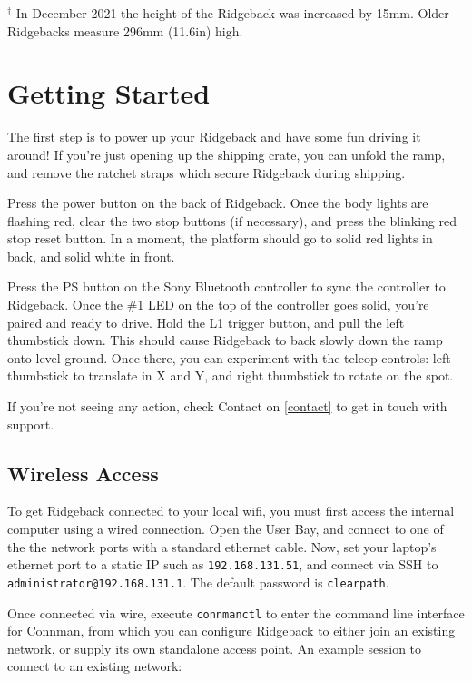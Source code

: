 \documentclass[]{clearpath-latex/clearpath-manual}
\begin{document}
$^\dagger$ In December 2021 the height of the Ridgeback was increased by 15mm.  Older Ridgebacks measure 296mm (11.6in) high.

\egroup




\section{Getting Started}

The first step is to power up your Ridgeback and have some fun driving it around! If you’re just opening up the shipping crate, you can unfold the ramp, and remove the ratchet straps which secure Ridgeback during shipping.

Press the power button on the back of Ridgeback. Once the body lights are flashing red, clear the two stop buttons (if necessary), and press the blinking red stop reset button. In a moment, the platform should go to solid red lights in back, and solid white in front.

Press the PS button on the Sony Bluetooth controller to sync the controller to Ridgeback. Once the \#1 LED on the top of the controller goes solid, you’re paired and ready to drive. Hold the L1 trigger button, and pull the left thumbstick down. This should cause Ridgeback to back slowly down the ramp onto level ground. Once there, you can experiment with the teleop controls: left thumbstick to translate in X and Y, and right thumbstick to rotate on the spot.

If you’re not seeing any action, check Contact on \autoref{contact} to get in touch with support.

\subsection{Wireless Access}

To get Ridgeback connected to your local wifi, you must first access the internal computer using a wired connection. Open the User Bay, and connect to one of the the network ports with a standard ethernet cable. Now, set your laptop’s ethernet port to a static IP such as \lstinline{192.168.131.51}, and connect via SSH to \lstinline{administrator@192.168.131.1}. The default password is \lstinline{clearpath}.

Once connected via wire, execute \lstinline{connmanctl} to enter the command line interface for Connman, from which you can configure Ridgeback to either join an existing network, or supply its own standalone access point. An example session to connect to an existing network:
\end{document}
